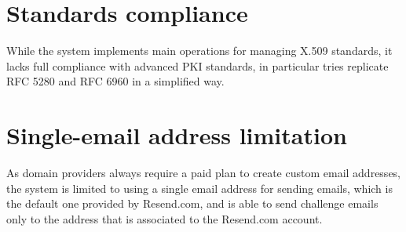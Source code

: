 \section{Standards compliance}

While the system implements main operations for managing X.509 standards, it lacks full compliance 
with advanced PKI standards, in particular tries replicate RFC 5280 and RFC 6960 in a simplified way.

\section{Single-email address limitation}
As domain providers always require a paid plan to create custom email addresses, the system is limited
to using a single email address for sending emails, which is the default one provided by Resend.com, and
is able to send challenge emails only to the address that is associated to the Resend.com account.